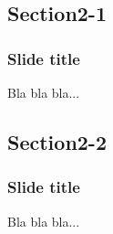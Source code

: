 \documentclass[t,compress,aspectratio=169]{beamer}
\begin{document}
\subsection{Section2-1}
\begin{frame}
\frametitle{Slide title}
Bla bla bla...
\end{frame}

\subsection{Section2-2}
\begin{frame}
\frametitle{Slide title}
Bla bla bla...
\end{frame}


\begin{frame}

\begin{center}
\begin{minipage}{0.8\textwidth}
\end{minipage}
\end{center}
\end{frame}





\end{document}
